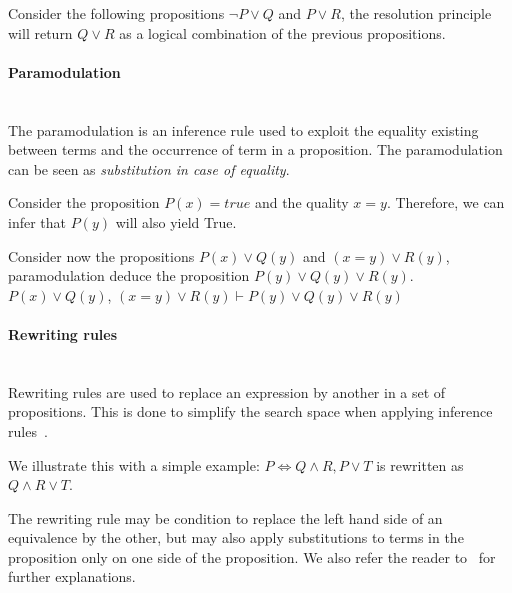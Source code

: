 Consider the following propositions $\neg P \vee Q$ and $P \vee R$, the resolution principle will return $Q \vee R$ as a logical combination of the previous propositions.

\paragraph{Paramodulation}\textbf{\\}
The paramodulation is an inference rule used to exploit the equality existing between terms and the occurrence of term in a proposition. The paramodulation can be seen as \textit{substitution in case of equality}.

Consider the proposition $P(x) = true$ and the quality $x=y$. Therefore, we can infer that $P(y)$ will also yield True.

Consider now the propositions $P(x) \vee Q(y)$ and $(x = y) \vee R(y)$, paramodulation deduce the proposition $P(y) \vee Q(y) \vee R(y)$.\\
$P(x) \vee Q(y)$, $(x = y) \vee R(y) \vdash P(y) \vee Q(y) \vee R(y)$

\paragraph{Rewriting rules}\textbf{\\}
Rewriting rules are used to replace an expression by another in a set of propositions.
This is done to simplify the search space when applying inference rules~\cite{snark-Stickel2000}.

We illustrate this with a simple example: $P \Leftrightarrow Q \wedge R, P \vee T$ is rewritten as $Q \wedge R \vee T$. 

The rewriting rule may be condition to replace the left hand side of an equivalence by the other, but may also apply substitutions to terms in the proposition only on one side of the proposition.
We also refer the reader to~\cite{snark-Stickel2000,symbolic-proof} for further explanations.
